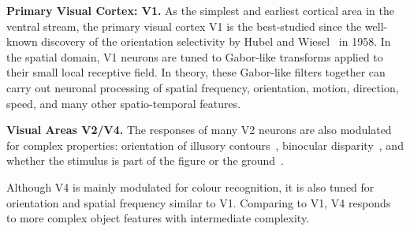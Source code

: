 \documentclass[journal]{journal}
\begin{document}
\textbf{Primary Visual Cortex: V1.}
As the simplest and earliest cortical area in the ventral stream, the primary visual cortex V1 is the best-studied since the well-known discovery of the orientation selectivity by Hubel and Wiesel~\cite{hubel1959receptive} in 1958.
In the spatial domain, V1 neurons are tuned to Gabor-like transforms applied to their small local receptive field.
In theory, these Gabor-like filters together can carry out neuronal processing of spatial frequency, orientation, motion, direction, speed, and many other spatio-temporal features.

\textbf{Visual Areas V2/V4.}
The responses of many V2 neurons are also modulated for complex properties: orientation of illusory contours~\cite{anzai2007neurons}, binocular disparity~\cite{daniel2009whither}, and whether the stimulus is part of the figure or the ground~\cite{qiu2005figure}.

%

Although V4 is mainly modulated for colour recognition, it is also tuned for orientation and spatial frequency similar to V1.
Comparing to V1, V4 responds to more complex object features with intermediate complexity.
\end{document}
